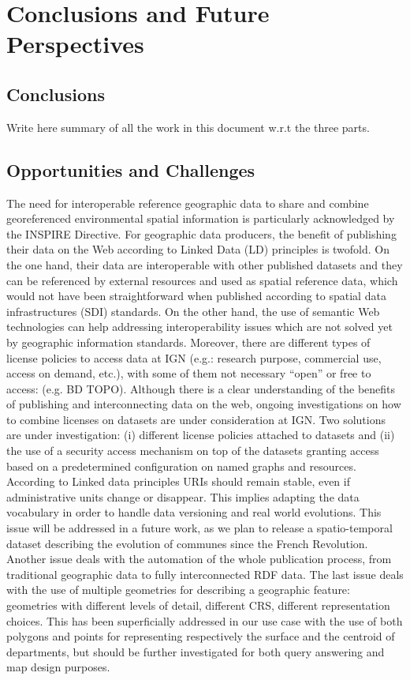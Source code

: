 \chapter{Conclusions and Future Perspectives}
\label{ch:conc}

\section{Conclusions}
\label{sec:final}
Write here summary of all the work in this document w.r.t the three parts.

\section{Opportunities and Challenges}\label{sec:challenges}

 The need for interoperable reference geographic data to share and combine georeferenced environmental spatial information is particularly acknowledged by the INSPIRE Directive. For geographic data producers, the benefit of publishing their data on the Web according to Linked Data  (LD) principles is twofold. On the one hand, their data are interoperable with other published datasets and they can be referenced by external resources and used as spatial reference data, which would not have been straightforward when published according to spatial data infrastructures (SDI) standards. On the other hand, the use of semantic Web technologies can help addressing interoperability issues which are not solved yet by geographic information standards. 
Moreover, there are different types of license policies to access data at IGN (e.g.: research purpose, commercial use, access on demand, etc.), with some of them not necessary ``open'' or free to access: (e.g. BD TOPO\circledR). Although there is a clear understanding of the benefits of publishing and interconnecting data on the web, ongoing investigations on how to combine licenses on datasets are under consideration at IGN. Two solutions are under investigation: (i) different license policies attached to datasets and (ii) the use of a security access mechanism on top of the datasets granting access based on a predetermined configuration on named graphs and resources. 
According to Linked data principles URIs should remain stable, even if administrative units change or disappear. This implies adapting the data vocabulary in order to handle data versioning and real world evolutions. This issue will be addressed in a future work, as we plan to release a spatio-temporal dataset describing the evolution of communes since the French Revolution. Another issue deals with the automation of the whole publication process, from traditional geographic data to fully interconnected RDF data.
The last issue deals with the use of multiple geometries for describing a geographic feature: geometries with different levels of detail, different CRS, different representation choices. This has been superficially addressed in our use case with the use of both polygons and points for representing respectively the surface and the centroid of departments, but should be further investigated for both query answering and map design purposes.


